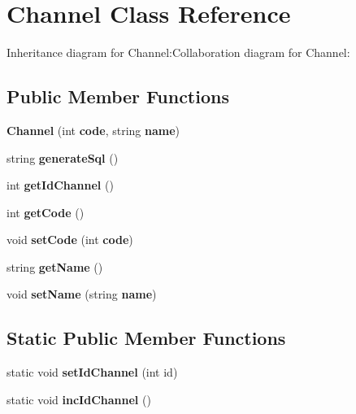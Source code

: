 \section{Channel Class Reference}
\label{classbr_1_1ufscar_1_1lince_1_1ginga_1_1recommender_1_1Channel}
Inheritance diagram for Channel:Collaboration diagram for Channel:\subsection*{Public Member Functions}
\begin{CompactItemize}
\item 
\textbf{Channel} (int {\bf code}, string {\bf name})\label{classbr_1_1ufscar_1_1lince_1_1ginga_1_1recommender_1_1Channel_6cb34fa05c2c3e28a3d7b9d53d1b85b2}

\item 
string \textbf{generateSql} ()\label{classbr_1_1ufscar_1_1lince_1_1ginga_1_1recommender_1_1Channel_8f1e45f781da9a5727416350efd7d586}

\item 
int \textbf{getIdChannel} ()\label{classbr_1_1ufscar_1_1lince_1_1ginga_1_1recommender_1_1Channel_786bcb57ea1975c4256f6e4cbb3bc2f9}

\item 
int \textbf{getCode} ()\label{classbr_1_1ufscar_1_1lince_1_1ginga_1_1recommender_1_1Channel_8361b009dd85dd991e5e684d648ffabf}

\item 
void \textbf{setCode} (int {\bf code})\label{classbr_1_1ufscar_1_1lince_1_1ginga_1_1recommender_1_1Channel_2520b3fc10894bb8fc4a96014dfb0d08}

\item 
string \textbf{getName} ()\label{classbr_1_1ufscar_1_1lince_1_1ginga_1_1recommender_1_1Channel_11335e13e50af74108bf926dc1340b4b}

\item 
void \textbf{setName} (string {\bf name})\label{classbr_1_1ufscar_1_1lince_1_1ginga_1_1recommender_1_1Channel_4eaf7a54a9d929af6602c086d9dfb4a5}

\end{CompactItemize}
\subsection*{Static Public Member Functions}
\begin{CompactItemize}
\item 
static void \textbf{setIdChannel} (int id)\label{classbr_1_1ufscar_1_1lince_1_1ginga_1_1recommender_1_1Channel_8eb6e0affb25108355cb4e6400fb3877}

\item 
static void \textbf{incIdChannel} ()\label{classbr_1_1ufscar_1_1lince_1_1ginga_1_1recommender_1_1Channel_ec8f21288ab2349bee34fa6490a15320}

\end{CompactItemize}
